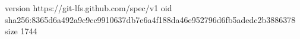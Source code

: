 version https://git-lfs.github.com/spec/v1
oid sha256:8365d6a492a9c9cc9910637db7e6a4f188da46e952796d6fb5adedc2b3886378
size 1744
